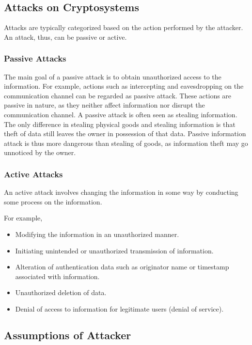 \documentclass[british]{article}
\begin{document}
\subsection{Attacks on Cryptosystems}

Attacks are typically categorized based on the action performed by
the attacker. An attack, thus, can be passive or active.

\subsubsection{Passive Attacks}

The main goal of a passive attack is to obtain unauthorized access
to the information. For example, actions such as intercepting and
eavesdropping on the communication channel can be regarded as passive
attack. These actions are passive in nature, as they neither affect
information nor disrupt the communication channel. A passive attack
is often seen as stealing information. The only difference in stealing
physical goods and stealing information is that theft of data still
leaves the owner in possession of that data. Passive information attack
is thus more dangerous than stealing of goods, as information theft
may go unnoticed by the owner.

\subsubsection{Active Attacks}

An active attack involves changing the information in some way by
conducting some process on the information.

For example, 
\begin{itemize}
\item Modifying the information in an unauthorized manner.
\item Initiating unintended or unauthorized transmission of information.
\item Alteration of authentication data such as originator name or timestamp
associated with information.
\item Unauthorized deletion of data.
\item Denial of access to information for legitimate users (denial of service).
\end{itemize}

\subsection{Assumptions of Attacker}
\end{document}
